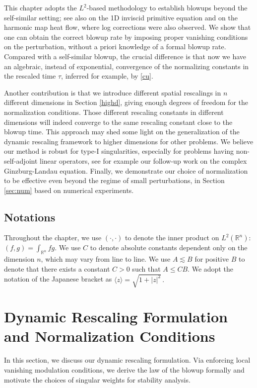 \documentclass[12pt]{caltech_thesis}
\numberwithin{equation}{section}
\begin{document}
This chapter adopts the $L^2$-based methodology to establish blowups beyond the self-similar setting; see also \cite{collot2023stable} on the 1D inviscid primitive equation and \cite{van2003formal} on the harmonic map heat flow, where log corrections were also observed. We show that one can obtain the correct blowup rate by imposing proper vanishing conditions on the perturbation, without a priori knowledge of a formal blowup rate. Compared with a self-similar blowup, the crucial difference is that now we have an algebraic, instead of exponential, convergence of the normalizing constants in the rescaled time $\tau$, inferred for example, by \eqref{cu}. 

Another contribution is that we introduce different spatial rescalings in $n$ different dimensions in Section \ref{highd}, giving enough degrees of freedom for the normalization conditions. Those different rescaling constants in different dimensions will indeed converge to the same rescaling constant close to the blowup time. This approach may shed some light on the generalization of the dynamic rescaling framework to higher dimensions for other problems. We believe our method is robust for type-I singularities, especially for problems having non-self-adjoint linear operators, see for example our follow-up work  \cite{chen2024stability} on the complex Ginzburg-Landau equation.
 Finally, we demonstrate our choice of normalization to be effective even beyond the regime of small perturbations, in Section \ref{sec:num} based on numerical experiments. 

 \subsection{Notations}
Throughout the chapter, we use $(\cdot,\cdot)$ to denote the inner product on $L^2(\mathbb{R}^n)$: $(f,g)=\int_{\mathbb{R}^n}fg$.     We use $C$ to denote absolute constants dependent only on the dimension $n$, which may vary from line to line. We use $A\lesssim B$ for positive $B$ to denote that there exists a constant $C>0$ such that $A\leq CB$.  We adopt the notation of the Japanese bracket as $\langle z\rangle=\sqrt{1+|z|^2}\,.$
\section{Dynamic Rescaling Formulation and Normalization Conditions}
\label{sec:dy}
In this section, we discuss our dynamic rescaling formulation. Via enforcing local vanishing modulation conditions, we derive the law of the blowup formally and motivate the choices of singular weights for stability analysis.
\end{document}
